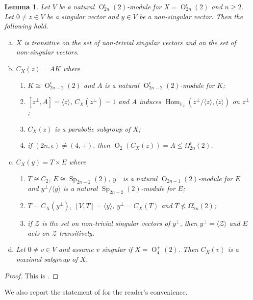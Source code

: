 \documentclass{amsart}
\numberwithin{equation}{section}
\newtheorem{lemma}[equation]{Lemma}
\theoremstyle{definition}
\theoremstyle{subresult}
\theoremstyle{caseresult}
\newcommand{\bF}{\mathbb{F}}
\newcommand{\Z}{\mathcal{Z}}
\newcommand{\Hom}{\operatorname{Hom}}
\newcommand{\Sp}{\operatorname{Sp}}
\renewcommand{\O}{\operatorname{O}}
\newcommand{\<}{\langle}
\renewcommand{\>}{\rangle}
\begin{document}
\begin{lemma}\label{lemma3.1 - orthogonal module}
    Let $V$ be a natural $\O^\epsilon_{2n}(2)$-module for $X=\O^\epsilon_{2n}(2)$ and $n \ge 2$. Let $0 \ne z \in V$ be a singular vector and $y \in V$ be a non-singular vector. Then the following hold.
    \begin{enumerate}[(a)]
        \item $X$ is transitive on the set of non-trivial singular vectors and on the set of non-singular vectors.
        \item $C_X(z)=AK$ where
        \begin{enumerate}[(1)]
            \item $K \cong \O^\epsilon_{2n-2}(2)$ and $A$ is a natural $\O^\epsilon_{2n-2}(2)$-module for $K$;
            \item $[z^\perp,A]=\<z\>$, $C_X(z^\perp) = 1$ and $A$ induces $\Hom_{\bF_2}(z^\perp/\<z\>, \<z\>)$ on $z^\perp$;
            \item $C_X(z)$ is a parabolic subgroup of $X$;
            \item if $(2n,\epsilon) \ne (4,+)$, then $\O_2(C_X(z)) = A \le \Omega^\epsilon_{2n}(2)$.
        \end{enumerate}
        \item $C_X(y) =T \times E$ where
        \begin{enumerate}[(1)]
            \item $T \cong C_2$, $E \cong \Sp_{2n-2}(2)$, $y^\perp$ is a natural $\O_{2n-1}(2)$-module for $E$ and $y^\perp/\<y\>$ is a natural $\Sp_{2n-2}(2)$-module for $E$;
            \item $T = C_X(y^\perp)$, $[V,T]=\<y\>$, $y^\perp=C_X(T)$ and $T \not \le \Omega^\epsilon_{2n}(2)$;
            \item if $\Z$ is the set on non-trivial singular vectors of $y^\perp$, then $y^\perp= \< \Z \>$ and $E$ acts on $\Z$ transitively.
        \end{enumerate}
        \item Let $0 \ne v \in V$ and assume $v$ singular if $X = \O^+_4(2)$. Then $C_X(v)$ is a maximal subgroup of $X$.
    \end{enumerate}
\end{lemma}
\begin{proof}
    This is \cite[Lemma 3.1]{Meier-Stell-Stroth:2012}.
\end{proof}

We also report the statement of \cite[Theorem C]{Meier-Stell-Stroth:2012} for the reader's convenience.
\end{document}
